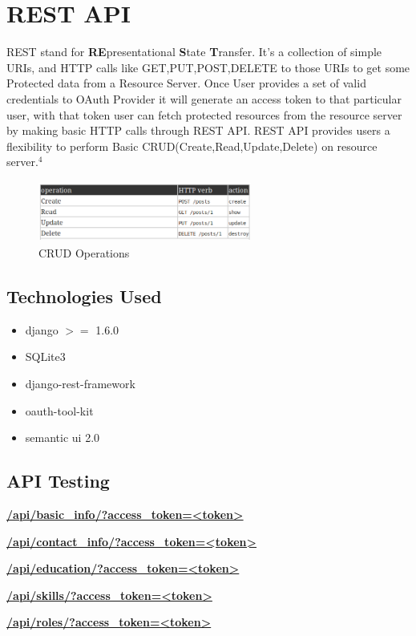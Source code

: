 \documentclass[12pt]{report}
\begin{document}
\section{REST API} 
\hspace{6mm}REST stand for \textbf{RE}presentational \textbf{S}tate \textbf{T}ransfer. It's a collection of simple URIs, and HTTP calls like GET,PUT,POST,DELETE to those URIs to get some Protected data from a Resource Server. Once User provides a set of valid credentials to OAuth Provider it will generate an access token to that particular user, with that token user can fetch protected resources from the resource server by making basic HTTP calls through REST API. REST API provides users a flexibility to perform Basic CRUD(Create,Read,Update,Delete) on resource server.$ ^{4}$
	\begin{figure}[H]
	\begin{center}
	\includegraphics[width=7cm,height=2cm]{CRUD}
	\caption{CRUD Operations\label{fig:CRUD Operations}}
	\end{center}
	\end{figure}
\subsection{Technologies Used}
\begin{itemize}
	\item django $ >= $ 1.6.0
	\item SQLite3
	\item django-rest-framework
	\item oauth-tool-kit
	\item semantic ui 2.0
\end{itemize}
\pagebreak
\subsection{API Testing}
\textbf{\url{/api/basic_info/?access_token=<token>}}
 
\underline{} \newline
\textbf{\url{/api/contact_info/?access_token=<token>}}

\underline{} \newline
\textbf{\url{/api/education/?access_token=<token>}}

\underline{} \newline
\textbf{\url{/api/skills/?access_token=<token>}}

\underline{} \newline
\textbf{\url{/api/roles/?access_token=<token>}}

\underline{} \newline
\end{document}
